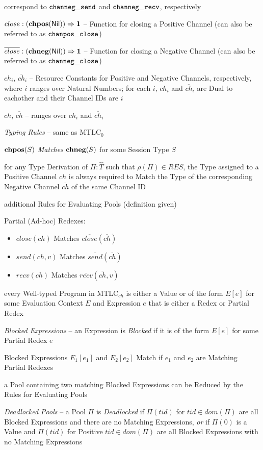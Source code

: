 correspond to $\mathtt{channeg\_send}$ and $\mathtt{channeg\_recv}$,
respectively

$close : (\mathbf{chpos}(\mathsf{Nil})) \Rightarrow \mathbf{1}$ -- Function for closing a
Positive Channel (can also be referred to as $\mathtt{chanpos\_close}$)

$\overline{close} : (\mathbf{chneg}(\mathsf{Nil})) \Rightarrow \mathbf{1}$ -- Function for
closing a Negative Channel (can also be referred to as
$\mathtt{channeg\_close}$)

$ch_i$, $\overline{ch}_i$ -- Resource Constants for Positive and
Negative Channels, respectively, where $i$ ranges over Natural
Numbers; for each $i$, $ch_i$ and $\overline{ch}_i$ are Dual to
eachother and their Channel IDs are $i$

$ch$, $\overline{ch}$ -- ranges over $ch_i$ and $\overline{ch}_i$


\emph{Typing Rules} -- same as MTLC$_0$

$\mathbf{chpos}(S)$ \emph{Matches} $\mathbf{chneg}(S)$ for some Session Type $S$

for any Type Derivation of $\Pi : \hat{T}$ such that $\rho(\Pi) \in
RES$, the Type assigned to a Positive Channel $ch$ is always required
to Match the Type of the corresponding Negative Channel
$\overline{ch}$ of the same Channel ID

additional Rules for Evaluating Pools (definition given)

Partial (Ad-hoc) Redexes:
\begin{itemize}
  \item $close(ch)$ Matches $\overline{close}(\overline{ch})$
  \item $send(ch,v)$ Matches $\overline{send}(\overline{ch})$
  \item $recv(ch)$ Matches $\overline{recv}(\overline{ch},v)$
\end{itemize}

every Well-typed Program in MTLC$_{ch}$ is either a Value or of the
form $E[e]$ for some Evaluation Context $E$ and Expression $e$ that is
either a Redex or Partial Redex

\emph{Blocked Expressions} -- an Expression is \emph{Blocked} if it is
of the form $E[e]$ for some Partial Redex $e$

Blocked Expressions $E_1[e_1]$ and $E_2[e_2]$ Match if $e_1$ and $e_2$
are Matching Partial Redexes

a Pool containing two matching Blocked Expressions can be Reduced
by the Rules for Evaluating Pools

\emph{Deadlocked Pools} -- a Pool $\Pi$ is \emph{Deadlocked} if
$\Pi(tid)$ for $tid \in dom(\Pi)$ are all Blocked Expressions and
there are no Matching Expressions, \emph{or} if $\Pi(0)$ is a Value
and $\Pi(tid)$ for Positive $tid \in dom(\Pi)$ are all Blocked
Expressions with no Matching Expressions

